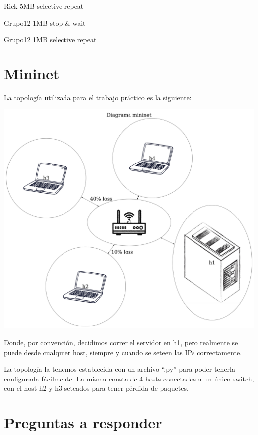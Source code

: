 \documentclass{article}
\begin{document}
Rick 5MB selective repeat

Grupo12 1MB stop \& wait

Grupo12 1MB selective repeat

\section{\texorpdfstring{\textbf{Mininet}}{Mininet}}\label{mininet}

La topología utilizada para el trabajo práctico es la siguiente:

\begin{center}
\includegraphics[scale=0.09999999999]{diagramaMininet}
\end{center}

Donde, por convención, decidimos correr el servidor en h1, pero realmente se puede desde cualquier host, siempre y cuando se seteen las IPs correctamente.

La topología la tenemos establecida con un archivo ``.py'' para poder tenerla configurada fácilmente. La misma consta de 4 hosts conectados a un único switch, con el host h2 y h3 seteados para tener pérdida de
paquetes.

\section{\texorpdfstring{\textbf{Preguntas a responder}}{Preguntas a responder}}\label{preguntas-a-responder}
\end{document}
